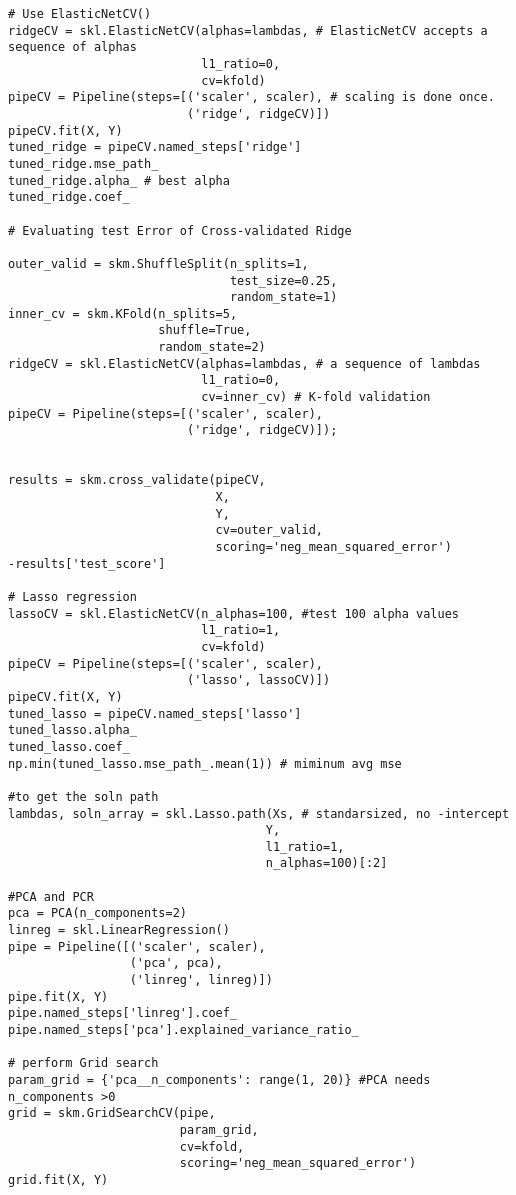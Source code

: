 \documentclass[
  letterpaper,
  DIV=11,
  numbers=noendperiod]{scrreprt}
\begin{document}
\begin{verbatim}
# Use ElasticNetCV()
ridgeCV = skl.ElasticNetCV(alphas=lambdas, # ElasticNetCV accepts a sequence of alphas
                           l1_ratio=0,
                           cv=kfold)
pipeCV = Pipeline(steps=[('scaler', scaler), # scaling is done once. 
                         ('ridge', ridgeCV)])
pipeCV.fit(X, Y)
tuned_ridge = pipeCV.named_steps['ridge']
tuned_ridge.mse_path_
tuned_ridge.alpha_ # best alpha
tuned_ridge.coef_

# Evaluating test Error of Cross-validated Ridge 

outer_valid = skm.ShuffleSplit(n_splits=1, 
                               test_size=0.25,
                               random_state=1)
inner_cv = skm.KFold(n_splits=5,
                     shuffle=True,
                     random_state=2)
ridgeCV = skl.ElasticNetCV(alphas=lambdas, # a sequence of lambdas
                           l1_ratio=0,
                           cv=inner_cv) # K-fold validation
pipeCV = Pipeline(steps=[('scaler', scaler),
                         ('ridge', ridgeCV)]);
                         
                         
results = skm.cross_validate(pipeCV, 
                             X,
                             Y,
                             cv=outer_valid,
                             scoring='neg_mean_squared_error')
-results['test_score']

# Lasso regression
lassoCV = skl.ElasticNetCV(n_alphas=100, #test 100 alpha values
                           l1_ratio=1,
                           cv=kfold)
pipeCV = Pipeline(steps=[('scaler', scaler),
                         ('lasso', lassoCV)])
pipeCV.fit(X, Y)
tuned_lasso = pipeCV.named_steps['lasso']
tuned_lasso.alpha_
tuned_lasso.coef_
np.min(tuned_lasso.mse_path_.mean(1)) # miminum avg mse

#to get the soln path
lambdas, soln_array = skl.Lasso.path(Xs, # standarsized, no -intercept
                                    Y,
                                    l1_ratio=1,
                                    n_alphas=100)[:2]

#PCA and PCR
pca = PCA(n_components=2)
linreg = skl.LinearRegression()
pipe = Pipeline([('scaler', scaler), 
                 ('pca', pca),
                 ('linreg', linreg)])
pipe.fit(X, Y)
pipe.named_steps['linreg'].coef_
pipe.named_steps['pca'].explained_variance_ratio_

# perform Grid search
param_grid = {'pca__n_components': range(1, 20)} #PCA needs n_components >0
grid = skm.GridSearchCV(pipe,
                        param_grid,
                        cv=kfold,
                        scoring='neg_mean_squared_error')
grid.fit(X, Y)


\end{verbatim}
\end{document}
